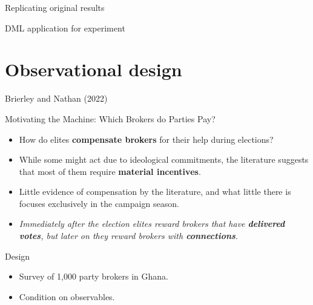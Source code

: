 \documentclass[10pt,table,aspectratio=169]{beamer}
\begin{document}
\begin{frame}[plain, label = two_dimensions]{Replicating original results}

\end{frame}


\begin{frame}[plain, label = two_dimensions]{DML application for experiment}

\end{frame}


\section{Observational design}

\begin{frame}[plain, label = two_dimensions]{Brierley and Nathan (2022)}

Motivating the Machine: Which Brokers do Parties Pay?\pause

\begin{itemize}
  \item How do elites \alert{\bf compensate brokers} for their help during elections?\pause
  \item While some might act due to ideological commitments, the literature suggests that most of them require \alert{\bf material incentives}.\pause
  \item Little evidence of compensation by the literature, and what little there is focuses exclusively in the campaign season.\pause
  \item \textit{Immediately after the election elites reward brokers that have \alert{\bf delivered votes}, but later on they reward brokers with \alert{\bf connections}.}\pause
\end{itemize}

Design

\begin{itemize}
  \item Survey of 1,000 party brokers in Ghana.\pause
  \item Condition on observables.
\end{itemize}

\end{frame}
\end{document}
